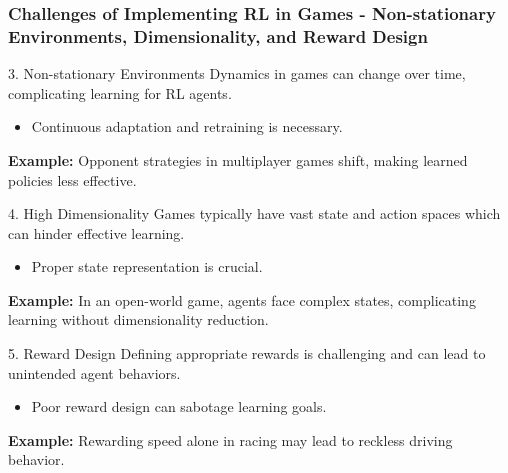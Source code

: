 \documentclass[aspectratio=169]{beamer}
\begin{document}
\begin{frame}[fragile]
    \frametitle{Challenges of Implementing RL in Games - Non-stationary Environments, Dimensionality, and Reward Design}
    \begin{block}{3. Non-stationary Environments}
        Dynamics in games can change over time, complicating learning for RL agents.
        \begin{itemize}
            \item Continuous adaptation and retraining is necessary.
        \end{itemize}
        \textbf{Example:} Opponent strategies in multiplayer games shift, making learned policies less effective.
    \end{block}
    
    \begin{block}{4. High Dimensionality}
        Games typically have vast state and action spaces which can hinder effective learning.
        \begin{itemize}
            \item Proper state representation is crucial.
        \end{itemize}
        \textbf{Example:} In an open-world game, agents face complex states, complicating learning without dimensionality reduction.
    \end{block}

    \begin{block}{5. Reward Design}
        Defining appropriate rewards is challenging and can lead to unintended agent behaviors.
        \begin{itemize}
            \item Poor reward design can sabotage learning goals.
        \end{itemize}
        \textbf{Example:} Rewarding speed alone in racing may lead to reckless driving behavior.
    \end{block}
\end{frame}
\end{document}

